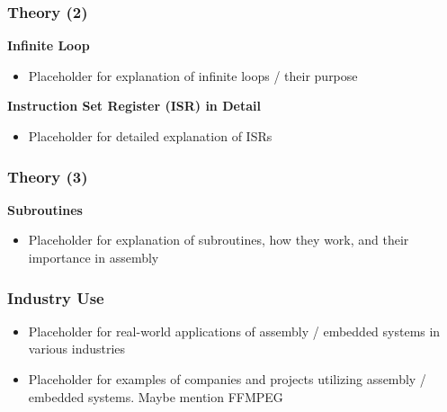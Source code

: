 \documentclass{beamer}
\begin{document}
\begin{frame}
    \frametitle{Theory (2)}
    \textbf{Infinite Loop}
    \begin{itemize}
        \item Placeholder for explanation of infinite loops / their purpose
    \end{itemize}

    \textbf{Instruction Set Register (ISR) in Detail}
    \begin{itemize}
        \item Placeholder for detailed explanation of ISRs
    \end{itemize}
\end{frame}

\begin{frame}
    \frametitle{Theory (3)}
    \textbf{Subroutines}
    \begin{itemize}
        \item Placeholder for explanation of subroutines, how they work, and their importance in assembly
    \end{itemize}
\end{frame}

\begin{frame}
    \frametitle{Industry Use}
    \begin{itemize}
        \item Placeholder for real-world applications of assembly / embedded systems in various industries
        \item Placeholder for examples of companies and projects utilizing assembly / embedded systems. Maybe mention FFMPEG
    \end{itemize}
\end{frame}
\end{document}
